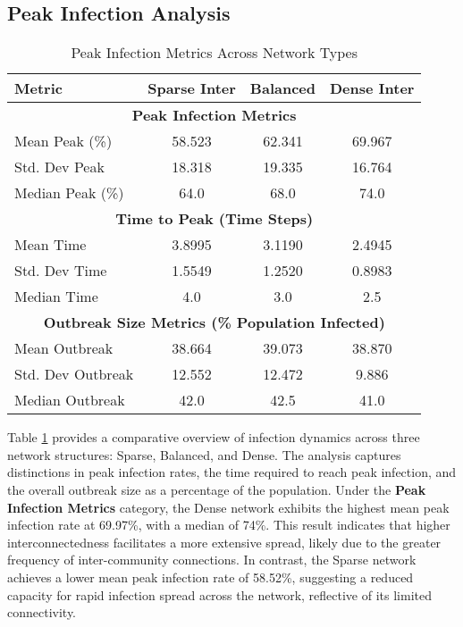 \documentclass[12pt,a4paper]{article}
\begin{document}
\subsection{Peak Infection Analysis}
\begin{table}[H]
\centering
\caption{Peak Infection Metrics Across Network Types}
\begin{tabular}{lccc}
\toprule
\textbf{Metric} & \textbf{Sparse Inter} & \textbf{Balanced} & \textbf{Dense Inter} \\
\midrule
\multicolumn{4}{c}{\textbf{Peak Infection Metrics}} \\
\midrule
Mean Peak (\%)   & 58.523 & 62.341 & 69.967 \\
Std. Dev Peak    & 18.318 & 19.335 & 16.764 \\
Median Peak (\%) & 64.0   & 68.0   & 74.0   \\
\midrule
\multicolumn{4}{c}{\textbf{Time to Peak (Time Steps)}} \\
\midrule
Mean Time        & 3.8995 & 3.1190 & 2.4945 \\
Std. Dev Time    & 1.5549 & 1.2520 & 0.8983 \\
Median Time      & 4.0    & 3.0    & 2.5    \\
\midrule
\multicolumn{4}{c}{\textbf{Outbreak Size Metrics (\% Population Infected)}} \\
\midrule
Mean Outbreak    & 38.664 & 39.073 & 38.870 \\
Std. Dev Outbreak & 12.552 & 12.472 & 9.886 \\
Median Outbreak  & 42.0   & 42.5   & 41.0   \\
\bottomrule
\end{tabular}
\label{tab:peak_metrics}
\end{table}

Table \ref{tab:peak_metrics} provides a comparative overview of infection dynamics across three network structures: Sparse, Balanced, and Dense. The analysis captures distinctions in peak infection rates, the time required to reach peak infection, and the overall outbreak size as a percentage of the population. Under the \textbf{Peak Infection Metrics} category, the Dense network exhibits the highest mean peak infection rate at 69.97\%, with a median of 74\%. This result indicates that higher interconnectedness facilitates a more extensive spread, likely due to the greater frequency of inter-community connections. In contrast, the Sparse network achieves a lower mean peak infection rate of 58.52\%, suggesting a reduced capacity for rapid infection spread across the network, reflective of its limited connectivity.
\end{document}
